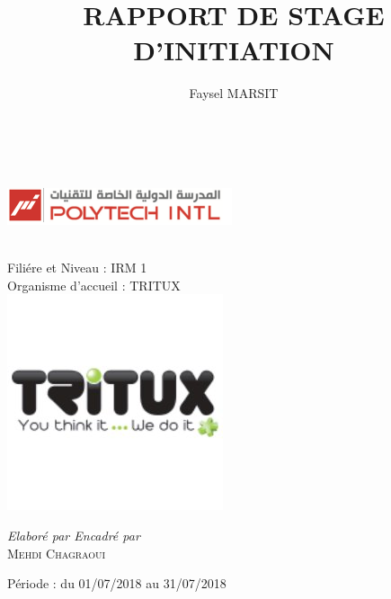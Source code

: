 \documentclass[a4paper,12pt,french]{article}
\title{RAPPORT DE
STAGE D’INITIATION}
\author{Faysel MARSIT}
\newcommand{\director}{Mehdi Chagraoui}
\begin{document}
	
	
		\fancypage{}{\fboxrule=1pt\fbox}


\begin{titlepage}
	



		\begin{center}
		
{\fontsize{12}{16}\selectfont{Ministère de l’enseignement supérieur et de la recherche scientifique}}\\
[1em]
{\fontsize{12}{16}\selectfont{Ecole Polytechnique Internationale Privée de Tunis}}\\
[1em]
\includegraphics[scale=2]{image/logo.png} 
\vspace*{2cm}


{\fontsize{26}{5}\selectfont{\thetitle\ }}\\	
[1cm]			
		\LARGE{Filiére et Niveau : IRM 1}\\
[1em]		
		\LARGE{Organisme d’accueil : TRITUX}	\\
		
		\includegraphics[scale=0.5]{image/logotritux.jpeg} 
			
		
			\LARGE
			\textit{Elaboré par \hspace{6cm} Encadré par }\\
			 \textsc{\theauthor \hspace{3cm} \director}\\ 
	
			\vspace*{1cm}
						
	\LARGE{Période : du  01/07/2018  au  31/07/2018}\\
	
	\vfill
	{\fontsize{16}{5}\selectfont{Année Universitaire 2017/2018}}\\

	
	
	\end{center}
			

	
\end{titlepage}
\end{document}

